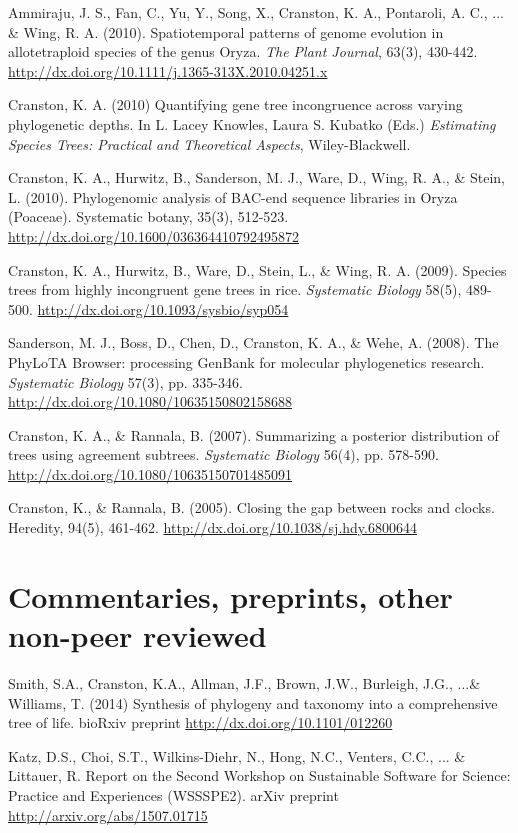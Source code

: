 \documentclass[10pt]{article}
\begin{document}
Ammiraju, J. S., Fan, C., Yu, Y., Song, X., Cranston, K. A., Pontaroli, A. C., ... \& Wing, R. A. (2010). Spatiotemporal patterns of genome evolution in allotetraploid species of the genus Oryza. \textit{The Plant Journal}, 63(3), 430-442. \url{http://dx.doi.org/10.1111/j.1365-313X.2010.04251.x} 

Cranston, K. A. (2010) Quantifying gene tree incongruence across varying phylogenetic depths. In L. Lacey Knowles, Laura S. Kubatko (Eds.) \textit{Estimating Species Trees: Practical and Theoretical Aspects}, Wiley-Blackwell.

Cranston, K. A., Hurwitz, B., Sanderson, M. J., Ware, D., Wing, R. A., \& Stein, L. (2010). Phylogenomic analysis of BAC-end sequence libraries in Oryza (Poaceae). Systematic botany, 35(3), 512-523. \url{http://dx.doi.org/10.1600/036364410792495872} 

Cranston, K. A., Hurwitz, B., Ware, D., Stein, L., \& Wing, R. A. (2009). Species trees from highly incongruent gene trees in rice.  \textit{Systematic Biology} 58(5), 489-500. \url{http://dx.doi.org/10.1093/sysbio/syp054} 

Sanderson, M. J., Boss, D., Chen, D., Cranston, K. A., \& Wehe, A. (2008). The PhyLoTA Browser: processing GenBank for molecular phylogenetics research. \textit{Systematic Biology} 57(3), pp. 335-346. \url{http://dx.doi.org/10.1080/10635150802158688} 

Cranston, K. A., \& Rannala, B. (2007). Summarizing a posterior distribution of trees using agreement subtrees. \textit{Systematic Biology} 56(4), pp. 578-590. \\
\url{http://dx.doi.org/10.1080/10635150701485091} 

Cranston, K., \& Rannala, B. (2005). Closing the gap between rocks and clocks. Heredity, 94(5), 461-462. \url{http://dx.doi.org/10.1038/sj.hdy.6800644}

\section*{Commentaries, preprints, other non-peer reviewed}

Smith, S.A., Cranston, K.A., Allman, J.F., Brown, J.W., Burleigh, J.G., ...\& Williams, T. (2014) Synthesis of phylogeny and taxonomy into a comprehensive tree of life. bioRxiv preprint \url{http://dx.doi.org/10.1101/012260}

Katz, D.S., Choi, S.T., Wilkins-Diehr, N., Hong, N.C., Venters, C.C., ... \& Littauer, R. Report on the Second Workshop on Sustainable Software for Science: Practice and Experiences (WSSSPE2). arXiv preprint \url{http://arxiv.org/abs/1507.01715}
\end{document}
